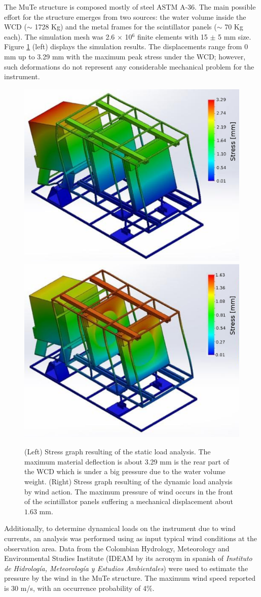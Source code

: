 \documentclass[letterpaper,11pt]{article}
\begin{document}
The MuTe structure is composed mostly of steel ASTM A-36. The main possible effort for the structure emerges from two sources: the water volume inside the WCD ($\sim$ 1728 Kg) and the metal frames for the scintillator panels ($\sim$ 70 Kg each). The simulation mesh was 2.6 $\times$ 10$^6$ finite elements with 15 $\pm$ 5 mm size. Figure \ref{fig:stress} (left) displays the simulation results. The displacements range from  0 mm up to 3.29 mm with the maximum peak stress under the WCD; however, such deformations do not represent any considerable mechanical problem for the instrument.

\begin{figure}[htb]
\centering
\includegraphics[width=0.48\columnwidth]{Figures/stress_graph.eps}
\includegraphics[width=0.48\columnwidth]{Figures/stress_graph_wind.eps}
\caption{(Left) Stress graph resulting of the static load analysis. The maximum material deflection is about 3.29 mm is the rear part of the WCD which is under a big pressure due to the water volume weight. (Right) Stress graph resulting of the dynamic load analysis by wind action. The maximum pressure of wind occurs in the front of the scintillator panels suffering a mechanical displacement about $1.63$ mm.}
\label{fig:stress}
\end{figure}

Additionally, to determine dynamical loads on the instrument due to wind currents, an analysis was performed using as input typical wind conditions at the observation area. Data from the Colombian Hydrology, Meteorology and Environmental Studies Institute (IDEAM by its acronym in spanish of \textit{Instituto de Hidrología, Meteorología y Estudios Ambientales}) were used to estimate the pressure by the wind in the MuTe structure. The maximum wind speed reported is 30 m/s, with an occurrence probability of 4\%.
\end{document}

